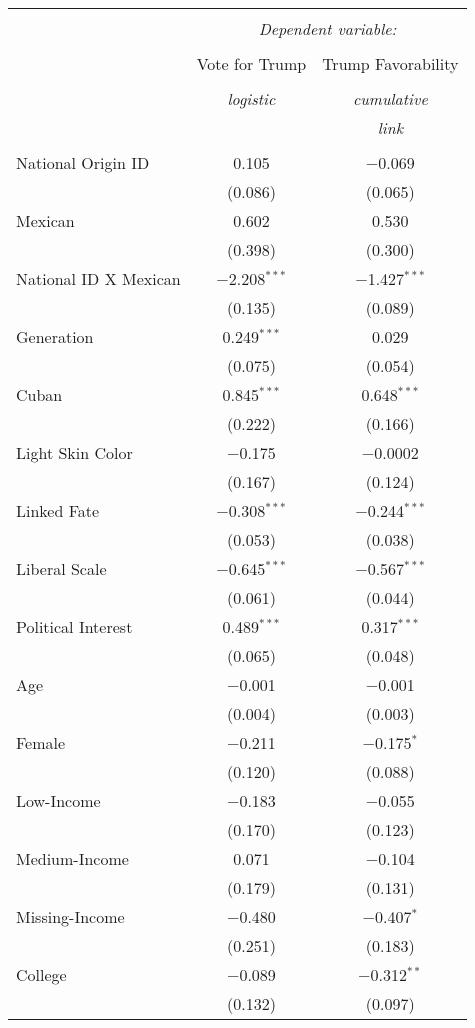 \documentclass[11pt]{article}
\begin{document}
\begin{table}[!htbp] \centering 
  \caption{} 
  \label{} 
\begin{tabular}{@{\extracolsep{5pt}}lcc} 
\\[-1.8ex]\hline 
\hline \\[-1.8ex] 
 & \multicolumn{2}{c}{\textit{Dependent variable:}} \\ 
\cline{2-3} 
\\[-1.8ex] & Vote for Trump   & Trump Favorability \\ 
\\[-1.8ex] & \textit{logistic} & \textit{cumulative} \\ 
 & \textit{} & \textit{link} \\ 
\hline \\[-1.8ex] 
 National Origin ID & 0.105 & $-$0.069 \\ 
  & (0.086) & (0.065) \\ 
  Mexican & 0.602 & 0.530 \\ 
  & (0.398) & (0.300) \\ 
  National ID X Mexican & $-$2.208$^{***}$ & $-$1.427$^{***}$ \\ 
  & (0.135) & (0.089) \\   
  Generation & 0.249$^{***}$ & 0.029 \\ 
  & (0.075) & (0.054) \\ 
  Cuban & 0.845$^{***}$ & 0.648$^{***}$ \\ 
  & (0.222) & (0.166) \\ 
  Light Skin Color & $-$0.175 & $-$0.0002 \\ 
  & (0.167) & (0.124) \\ 
  Linked Fate  & $-$0.308$^{***}$ & $-$0.244$^{***}$ \\ 
  & (0.053) & (0.038) \\ 
  Liberal Scale & $-$0.645$^{***}$ & $-$0.567$^{***}$ \\ 
  & (0.061) & (0.044) \\ 
  Political Interest & 0.489$^{***}$ & 0.317$^{***}$ \\ 
  & (0.065) & (0.048) \\ 
  Age & $-$0.001 & $-$0.001 \\ 
  & (0.004) & (0.003) \\ 
  Female & $-$0.211 & $-$0.175$^{*}$ \\ 
  & (0.120) & (0.088) \\ 
  Low-Income & $-$0.183 & $-$0.055 \\ 
  & (0.170) & (0.123) \\ 
  Medium-Income & 0.071 & $-$0.104 \\ 
  & (0.179) & (0.131) \\ 
  Missing-Income & $-$0.480 & $-$0.407$^{*}$ \\ 
  & (0.251) & (0.183) \\ 
  College & $-$0.089 & $-$0.312$^{**}$ \\ 
  & (0.132) & (0.097) \\ 


\end{tabular}
\end{table}
\end{document}
